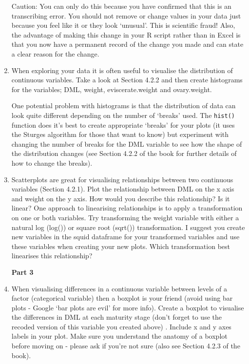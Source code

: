 \documentclass[12pt]{article}
\newcommand{\lst}[1]{\lstinline{#1}}
\begin{document}
\begin{enumerate}
Caution: You can only do this because you have confirmed that this is an transcribing error. You should not remove or change values in your data just because you feel like it or they look ‘unusual’. This is scientific fraud! Also, the advantage of making this change in your R script rather than in Excel is that you now have a permanent record of the change you made and can state a clear reason for the change.

 \item When exploring your data it is often useful to visualise the distribution of continuous variables. Take a look at Section 4.2.2 and then create histograms for the variables; DML, weight, eviscerate.weight and ovary.weight. 
 
One potential problem with histograms is that the distribution of data can look quite different depending on the number of ‘breaks’ used. The \lst{hist()} function does it’s best to create appropriate ‘breaks’ for your plots (it uses the Sturges algorithm for those that want to know) but experiment with changing the number of breaks for the DML variable to see how the shape of the distribution changes (see Section 4.2.2 of the book for further details of how to change the breaks).

 
\item Scatterplots are great for visualising relationships between two continuous variables (Section 4.2.1). Plot the relationship between DML on the x axis and weight on the y axis. How would you describe this relationship? Is it linear? One approach to linearising relationships is to apply a transformation on one or both variables. Try transforming the weight variable with either a natural log (log()) or square root (sqrt()) transformation. I suggest you create new variables in the squid dataframe for your transformed variables and use these variables when creating your new plots. Which transformation best linearises this relationship? 

\centerline{\bf Part 3}
 
\item When visualising differences in a continuous variable between levels of a factor (categorical variable) then a boxplot is your friend (avoid using bar plots - Google ‘bar plots are evil’ for more info). Create a boxplot to visualise the differences in DML at each maturity stage (don’t forget to use the recoded version of this variable you created above) . Include x and y axes labels in your plot. Make sure you understand the anatomy of a boxplot before moving on - please ask if you’re not sure (also see Section 4.2.3 of the book). 


\end{enumerate}
\end{document}
